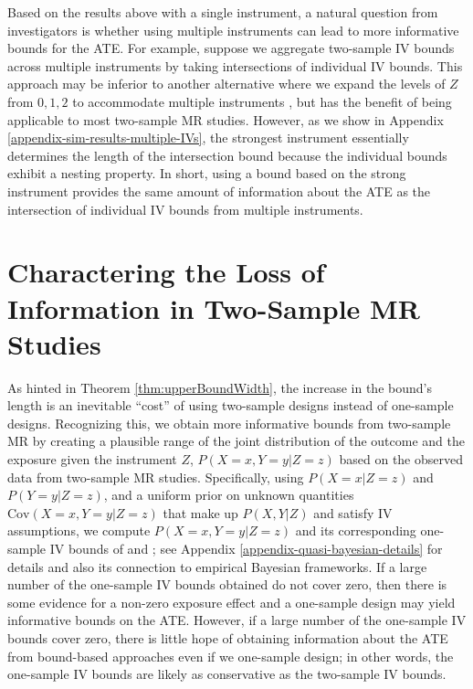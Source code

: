 \documentclass[
]{article}
\theoremstyle{plain}
\begin{document}
Based on the results above with a single instrument, a natural question from investigators is whether using multiple instruments can lead to more informative bounds for the ATE. For example, suppose we aggregate two-sample IV bounds across multiple instruments by taking intersections of individual IV bounds. This approach may be inferior to another alternative where we expand the levels of \(Z\) from \(0,1,2\) to accommodate multiple instruments \autocite{swanson_commentary_2017}, but has the benefit of being applicable to most two-sample MR studies. However, as we show in Appendix \ref{appendix-sim-results-multiple-IVs}, the strongest instrument essentially determines the length of the intersection bound because the individual bounds exhibit a nesting property. In short, using a bound based on the strong instrument provides the same amount of information about the ATE as the intersection of individual IV bounds from multiple instruments.

\hypertarget{charactering-the-loss-of-information-in-two-sample-mr-studies}{%
\section{Charactering the Loss of Information in Two-Sample MR Studies}\label{charactering-the-loss-of-information-in-two-sample-mr-studies}}

\label{quasi-bayesian}

As hinted in Theorem \ref{thm:upperBoundWidth}, the increase in the bound's length is an inevitable ``cost'' of using two-sample designs instead of one-sample designs. Recognizing this, we obtain more informative bounds from two-sample MR by creating a plausible range of the joint distribution of the outcome and the exposure given the instrument \(Z\), \(P(X = x, Y = y | Z = z)\) based on the observed data from two-sample MR studies. Specifically, using \(P(X = x | Z = z)\) and \(P(Y = y | Z = z)\), and a uniform prior on unknown quantities \(\text{Cov}(X = x, Y = y| Z = z)\) that make up \(P(X,Y | Z)\) and satisfy IV assumptions, we compute \(P(X = x, Y = y | Z = z)\) and its corresponding one-sample IV bounds of \textcite{balke_bounds_1997} and \textcite{richardson_ace_2014}; see Appendix \ref{appendix-quasi-bayesian-details} for details and also its connection to empirical Bayesian frameworks. If a large number of the one-sample IV bounds obtained do not cover zero, then there is some evidence for a non-zero exposure effect and a one-sample design may yield informative bounds on the ATE. However, if a large number of the one-sample IV bounds cover zero, there is little hope of obtaining information about the ATE from bound-based approaches even if we one-sample design; in other words, the one-sample IV bounds are likely as conservative as the two-sample IV bounds.
\end{document}

